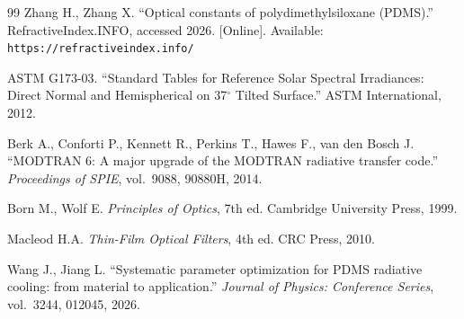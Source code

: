 \begin{thebibliography}{99}
 Zhang H., Zhang X. ``Optical constants of polydimethylsiloxane (PDMS).'' RefractiveIndex.INFO, accessed 2026. [Online]. Available: \texttt{https://refractiveindex.info/}

 ASTM G173-03. ``Standard Tables for Reference Solar Spectral Irradiances: Direct Normal and Hemispherical on 37$^{\circ}$ Tilted Surface.'' ASTM International, 2012.

 Berk A., Conforti P., Kennett R., Perkins T., Hawes F., van den Bosch J. ``MODTRAN 6: A major upgrade of the MODTRAN radiative transfer code.'' \emph{Proceedings of SPIE}, vol.~9088, 90880H, 2014.

 Born M., Wolf E. \emph{Principles of Optics}, 7th ed. Cambridge University Press, 1999.

 Macleod H.A. \emph{Thin-Film Optical Filters}, 4th ed. CRC Press, 2010.

 Wang J., Jiang L. ``Systematic parameter optimization for PDMS radiative cooling: from material to application.'' \emph{Journal of Physics: Conference Series}, vol.~3244, 012045, 2026.

\end{thebibliography}
